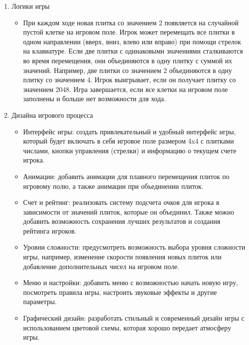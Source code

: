 \begin{enumerate}
\item Логики игры
\begin{itemize}
\item При каждом ходе новая плитка со значением 2 появляется на случайной пустой клетке на игровом поле. Игрок может перемещать все плитки в одном направлении (вверх, вниз, влево или вправо) при помощи стрелок на клавиатуре.
Если две плитки с одинаковыми значениями сталкиваются во время перемещения, они объединяются в одну плитку с суммой их значений. Например, две плитки со значением 2 объединяются в одну плитку со значением 4.
Игрок выигрывает, если он получает плитку со значением 2048. Игра завершается, если все клетки на игровом поле заполнены и больше нет возможности для хода.
\end{itemize}
\item Дизайна игрового процесса
\begin{itemize}
\item Интерфейс игры: создать привлекательный и удобный интерфейс игры, который будет включать в себя игровое поле размером 4x4 с плитками числами, кнопки управления (стрелки) и информацию о текущем счете игрока.

\item Анимации: добавить анимации для плавного перемещения плиток по игровому полю, а также анимации при объединении плиток.

\item Счет и рейтинг: реализовать систему подсчета очков для игрока в зависимости от значений плиток, которые он объединил. Также можно добавить возможность сохранения лучших результатов и создания рейтинга игроков.

\item Уровни сложности: предусмотреть возможность выбора уровня сложности игры, например, изменение скорости появления новых плиток или добавление дополнительных чисел на игровом поле.

\item Меню и настройки: добавить меню с возможностью начать новую игру, посмотреть правила игры, настроить звуковые эффекты и другие параметры.

\item Графический дизайн: разработать стильный и современный дизайн игры с использованием цветовой схемы, которая хорошо передает атмосферу игры.

\end{itemize}
\end{enumerate}
